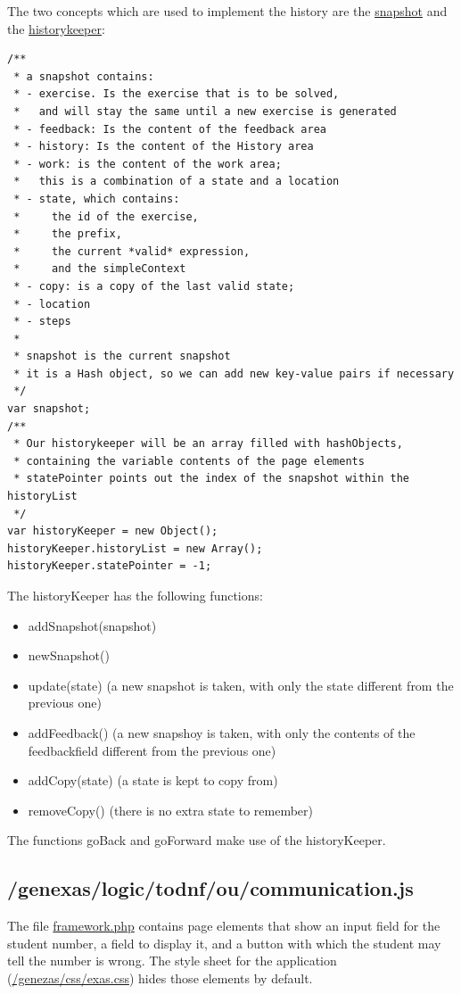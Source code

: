 \documentclass{article}
\begin{document}
The two concepts which are used to implement the history are the \url{snapshot} and the \url{historykeeper}:
\begin{verbatim}
/**
 * a snapshot contains:
 * - exercise. Is the exercise that is to be solved, 
 *   and will stay the same until a new exercise is generated
 * - feedback: Is the content of the feedback area
 * - history: Is the content of the History area
 * - work: is the content of the work area; 
 *   this is a combination of a state and a location
 * - state, which contains: 
 *     the id of the exercise, 
 *     the prefix, 
 *     the current *valid* expression, 
 *     and the simpleContext
 * - copy: is a copy of the last valid state; 
 * - location
 * - steps
 * 
 * snapshot is the current snapshot
 * it is a Hash object, so we can add new key-value pairs if necessary
 */
var snapshot;
/**
 * Our historykeeper will be an array filled with hashObjects, 
 * containing the variable contents of the page elements
 * statePointer points out the index of the snapshot within the historyList
 */
var historyKeeper = new Object();
historyKeeper.historyList = new Array();
historyKeeper.statePointer = -1;
\end{verbatim}

The historyKeeper has the following functions:
\begin{itemize}
\item addSnapshot(snapshot)
\item newSnapshot()
\item update(state) (a new snapshot is taken, with only the state different from the previous one)
\item addFeedback() (a new snapshoy is taken, with only the contents of the feedbackfield different from the previous one)
\item addCopy(state) (a state is kept to copy from)
\item removeCopy() (there is no extra state to remember)
\end{itemize}

The functions goBack and goForward make use of the historyKeeper.

\subsection{/genexas/logic/todnf/ou/communication.js}
The file \url{framework.php} contains page elements that show an input field for the student number, a field to display it, and a button with which the student may tell the number is wrong. The style sheet for the application (\url{/genezas/css/exas.css}) hides those elements by default.
\end{document}
